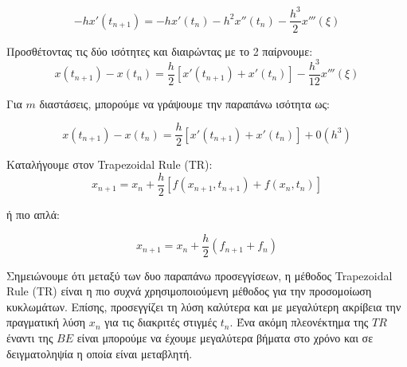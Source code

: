 \begin{enumerate}
    \begin{equation}
      -h x'(t_{n+1}) = -h x'(t_n) - h^2 x''(t_n) - \frac{h^3}{2}x'''(\xi)
    \end{equation}
    
    Προσθέτοντας τις δύο ισότητες και διαιρώντας με το 2 παίρνουμε:
    \begin{equation}
        x(t_{n+1}) - x(t_n) = \frac{h}{2} [ x'(t_{n+1}) + x'(t_n)] - \frac{h^3}{12} x'''(\xi)
    \end{equation}
    
    Για $m$ διαστάσεις, μπορούμε να γράψουμε την παραπάνω ισότητα ως:
    
    \begin{equation}
        x(t_{n+1}) - x(t_n) = \frac{h}{2} [x'(t_{n+1}) + x'(t_n)] + 0(h^3)
    \end{equation}
    
    Καταλήγουμε στον \textlatin{Trapezoidal Rule (TR)}:
    \begin{equation}
        x_{n+1} = x_n + \frac{h}{2} [ f(x_{n+1}, t_{n+1}) + f(x_n, t_n)]
    \end{equation}
    
    ή πιο απλά:
    
    \begin{equation}
        x_{n+1} = x_n + \frac{h}{2} (f_{n+1} + f_n)
    \end{equation}
    
    
\end{enumerate}

Σημειώνουμε ότι μεταξύ των δυο παραπάνω προσεγγίσεων, η μέθοδος \textlatin{Trapezoidal Rule (TR)} είναι η πιο συχνά χρησιμοποιούμενη μέθοδος για την προσομοίωση κυκλωμάτων. Επίσης, προσεγγίζει τη λύση καλύτερα και με μεγαλύτερη ακρίβεια την πραγματική λύση $x_n$ για τις διακριτές στιγμές $t_n$. Ένα ακόμη πλεονέκτημα της $TR$ έναντι της $BE$ είναι μπορούμε να έχουμε μεγαλύτερα βήματα στο χρόνο και σε δειγματοληψία η οποία είναι μεταβλητή.
